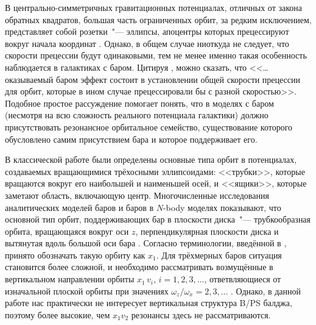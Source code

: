 \documentclass[tikz]{trlnotes}
\begin{document}
\newlength{\imageheight}
\imageheight=5.5cm
В центрально-симметричных гравитационных потенциалах, отличных от закона обратных квадратов, большая часть ограниченных орбит, за редким исключением, представляет собой розетки~"--- эллипсы, апоцентры которых прецессируют вокруг начала координат \citep{book:14857}. Однако, в общем случае ниоткуда не следует, что скорости прецессии будут одинаковыми, тем не менее именно такая особенность наблюдается в галактиках с баром.
Цитируя \cite{sellwood2014a}, можно сказать, что <<\ldots оказываемый баром эффект состоит в установлении общей скорости
прецессии для орбит, которые в ином случае прецессировали бы с разной скоростью>>.
Подобное простое рассуждение помогает понять, что в моделях с баром (несмотря на всю сложность реального потенциала галактики)
должно присутствовать резонансное орбитальное семейство, существование которого обусловлено самим присутствием бара и которое поддерживает его.

В классической работе \citet{dezeeuw1985} были определены основные типа орбит в потенциалах, создаваемых вращающимися трёхосными эллипсоидами: <<трубки>>, которые вращаются вокруг его наибольшей и наименьшей осей, и <<ящики>>, которые заметают область, включающую центр.  Многочисленные исследования аналитических моделей баров и баров в $N$-body моделях показывают, что основной тип орбит, поддерживающих бар в плоскости диска~"--- трубкообразная орбита, вращающаяся вокруг оси $z$, перпендикулярная плоскости диска и вытянутая вдоль большой оси бара \citep{athanassoula2003}. Согласно терминологии, введённой в \citet{contopoulos1980a}, принято обозначать такую
орбиту как $x_1$. Для трёхмерных баров ситуация становится более сложной, и необходимо рассматривать возмущённые в
вертикальном направлении орбиты $x_1\,v_i$, $i=1,2,3, \dotsc$,
ответвляющиеся от изначальной плоской орбиты при значениях 
$ω_z/ω_x = 2,3, \dotsc$ \citep{skokos2002a,pfenniger1991}. Однако, в данной работе нас практически не интересует
вертикальная структура B/PS балджа, поэтому более высокие, чем $x_1v_2$ резонансы здесь не рассматриваются.
\end{document}
